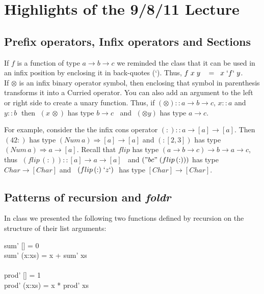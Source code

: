 \documentclass[11pt]{article}
\begin{document}


\section{ Highlights of the 9/8/11 Lecture}

\subsection{Prefix operators, Infix operators and Sections}

If $f$ is a function of type $a\rightarrow{}b\rightarrow{}c$ we reminded the
class that it can be used in an infix position by enclosing it in back-quotes
(`).  Thus, $f\; x\; y\;\;\ = \;\; x\; `f`\; y$.\\

If $\otimes$ is an infix binary operator symbol, then enclosing that symbol in
parenthesis transforms it into a Curried operator. You can also add an argument
to the left or right side to create a unary function.  Thus, if $(\otimes) ::
a\rightarrow{} b \rightarrow{}c$, $x::a$ and $y::b\;$ then $\;(x\,\otimes)$ has type $b\rightarrow{}c\;\;$ and $\;(\otimes{}y)$ has type $a\rightarrow{}c$.


For example, consider the the infix cons operator $(:) ::
a\rightarrow{}[a]\rightarrow[a]$.  Then $(42 :)$ has type $(Num\,a)\Rightarrow
[a] \rightarrow [a]$ and $(:[2,3])$ has type $(Num\,a)\Rightarrow a \rightarrow
[a]$.  Recall that $flip$ has type $ (a \rightarrow{} b \rightarrow{} c)
\rightarrow{} b \rightarrow{} a \rightarrow{} c$, thus $\;(flip \,(:)) :: [a]
\rightarrow{}a\rightarrow{}[a]\;\;$ and $("bc"\; (flip\,(:)))$ has type $Char
\rightarrow [Char]$ and $\;\;(flip\, (:)\; `z`)\;$ has type
$[Char]\rightarrow[Char]$.

\subsection{Patterns of recursion and {\it{foldr}}}

In class we presented the following two functions defined by recursion on the
structure of their list arguments:

\begin{program**}
\> sum' [] = 0\\
\> sum' (x:xs) = x + sum' xs\\
\> \\
\> prod' [] = 1\\
\> prod' (x:xs) = x * prod' xs\\
\end{program**}
\end{document}
